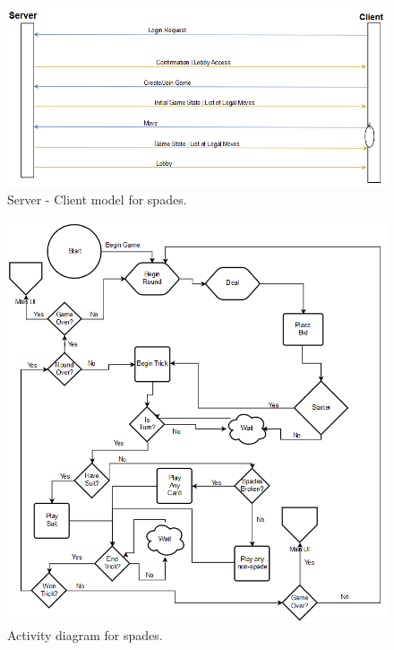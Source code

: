 \begin{figure}
		\begin{center}
		\includegraphics{graphics/SLfigure1}
		\caption{Server - Client model for spades.}
		\label{Figure 1}
		\end{center}
	\end{figure}
	
	\begin{figure}
		\begin{center}
		\includegraphics{graphics/SLfigure2}
		\caption{Activity diagram for spades.}
		\label{Figure 1}
		\end{center}
	\end{figure}
	
